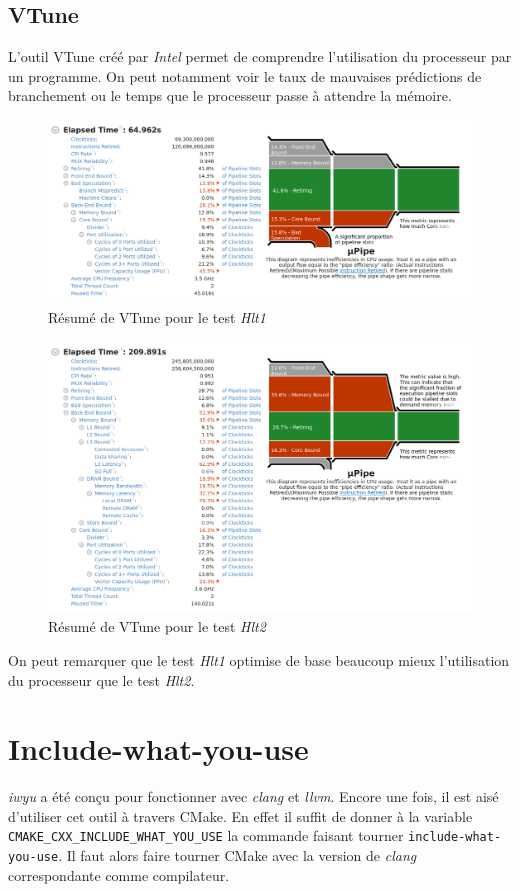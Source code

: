 \documentclass[a4paper]{report}
\begin{document}
\subsection{VTune}
L'outil VTune créé par \emph{Intel} permet de comprendre l'utilisation du processeur par un programme.
On peut notamment voir le taux de mauvaises prédictions de branchement ou le temps que le processeur passe à attendre la mémoire.

\begin{figure}[H]
    \includegraphics[width=\textwidth, center]{vtune_hlt1.png}
    \caption{Résumé de VTune pour le test \emph{Hlt1}}
    \label{vtune_hlt1}
\end{figure}

\begin{figure}[H]
    \includegraphics[width=\textwidth, center]{vtune_hlt2.png}
    \caption{Résumé de VTune pour le test \emph{Hlt2}}
    \label{vtune_hlt2}
\end{figure}

On peut remarquer que le test \emph{Hlt1} optimise de base beaucoup mieux l'utilisation du processeur que le test \emph{Hlt2}.

\section{Include-what-you-use}
\emph{iwyu} a été conçu pour fonctionner avec \emph{clang} et \emph{llvm}.
Encore une fois, il est aisé d'utiliser cet outil à travers CMake.
En effet il suffit de donner à la variable \verb'CMAKE_CXX_INCLUDE_WHAT_YOU_USE' la commande faisant tourner \verb'include-what-you-use'.
Il faut alors faire tourner CMake avec la version de \emph{clang} correspondante comme compilateur.
\end{document}
